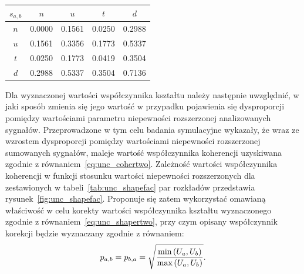 \begin{table}[htb!]
\begin{center}
\begin{tabular}[c]{| c *{4}{|S[table-format = 1.4]} |} \hline
$s_{a,b}$ & \textbf{$n$} & \textbf{$u$} & \textbf{$t$} & \textbf{$d$} \\ \hline
$n$       & 0.0000       & 0.1561       & 0.0250       & 0.2988       \\ \hline
$u$       & 0.1561       & 0.3356       & 0.1773       & 0.5337       \\ \hline
$t$       & 0.0250       & 0.1773       & 0.0419       & 0.3504       \\ \hline
$d$       & 0.2988       & 0.5337       & 0.3504       & 0.7136       \\ \hline
\end{tabular}
\end{center}
\end{table}

Dla wyznaczonej wartości współczynnika kształtu należy następnie uwzględnić, w jaki sposób zmienia się jego wartość w przypadku pojawienia się dysproporcji pomiędzy wartościami parametru niepewności rozszerzonej analizowanych sygnałów. Przeprowadzone w tym celu badania symulacyjne wykazały, że wraz ze wzrostem dysproporcji pomiędzy wartościami niepewności rozszerzonej sumowanych sygnałów, maleje wartość współczynnika koherencji uzyskiwana zgodnie z równaniem~\eqref{eq:unc_cohertwo}. Zależność wartości współczynnika koherencji w funkcji stosunku wartości niepewności rozszerzonych dla zestawionych w tabeli~\ref{tab:unc_shapefac} par rozkładów przedstawia rysunek~\ref{fig:unc_shapefac}. Proponuje się zatem wykorzystać omawianą właściwość w celu korekty wartości współczynnika kształtu wyznaczonego zgodnie z równaniem~\eqref{eq:unc_shapertwo}, przy czym opisany współczynnik korekcji będzie wyznaczany zgodnie z równaniem:
\begin{equation}
p_{a,b} = p_{b,a} = \sqrt{\frac{\min \left(U_{a}, U_{b}\right)}{\max \left(U_{a}, U_{b}\right)}} \label{eq:unc_cohercorra}.
\end{equation}

